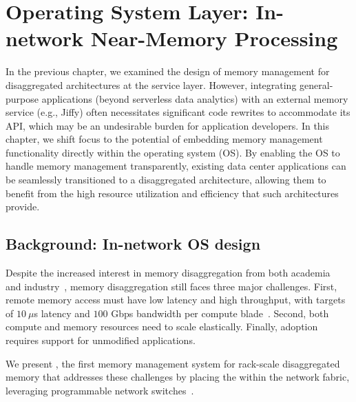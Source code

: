 \chapter{Operating System Layer: In-network Near-Memory Processing}
\label{chap:os}
In the previous chapter, we examined the design of memory management for disaggregated architectures at the service layer. However, integrating general-purpose applications (beyond serverless data analytics) with an external memory service (e.g., Jiffy) often necessitates significant code rewrites to accommodate its API, which may be an undesirable burden for application developers. In this chapter, we shift focus to the potential of embedding memory management functionality directly within the operating system (OS). By enabling the OS to handle memory management transparently, existing data center applications can be seamlessly transitioned to a disaggregated architecture, allowing them to benefit from the high resource utilization and efficiency that such architectures provide.

\section{Background: In-network OS design}

Despite the increased interest in memory disaggregation from both academia~\cite{memdisagg2, memdisagg3, memdisagg4, memdisagg5, memdisagg6, memdisagg1, legoos, infiniswap, fastswap, disagg, disaggfault} and industry~\cite{industry0, industry1, industry2, industry3, industry4, industry5}, memory disaggregation still faces three major challenges. First, remote memory access must have low latency and high throughput, with targets of $10~\mu$s latency and $100$ Gbps bandwidth per compute blade~\cite{legoos, infiniswap, fastswap, disagg}. Second, both compute and memory resources need to scale elastically. Finally, adoption requires support for unmodified applications.

We present \mind, the first memory management system for rack-scale disaggregated memory that addresses these challenges by placing the \mmm within the network fabric, leveraging programmable network switches~\cite{progswitch1, progswitch2}.


